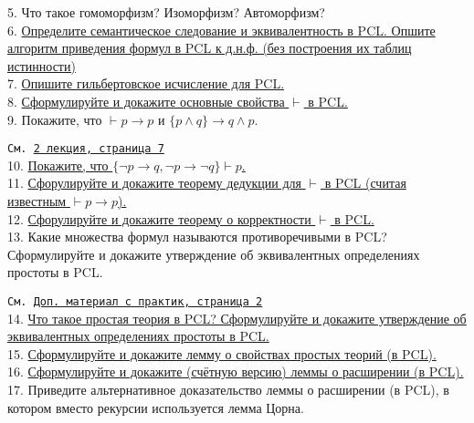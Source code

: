 \documentclass[a4paper,100pt]{article}
\theoremstyle{indented}
\theoremstyle{definition}
\theoremstyle{remark}
\DeclareMathOperator{\ra}{\rightarrow}
\begin{document}
5. %
{Что такое гомоморфизм? Изоморфизм? Автоморфизм?} \\

6. \hyperlink{b6}{Определите семантическое следование и эквивалентность в PCL. Опшите алгоритм приведения формул в PCL к д.н.ф. (без построения их таблиц истинности)} \\ 

7. \hyperlink{b7}{Опишите гильбертовское исчисление для PCL.} \\

8. \hyperlink{b8}{Сформулируйте и докажите основные свойства $\vdash$ в PCL.} \\

9. %
{Покажите, что $\vdash p \ra p$ и $\{p\wedge q\}\ra q \wedge p$.} \

\texttt{См. \href{http://www.mi-ras.ru/~speranski/courses/logic-1-2021-spring/slides_2.pdf}{2 лекция, страница 7}}\\

10. \hyperlink{b10}{Покажите, что $\{\neg p \ra q, \neg p \ra \neg q\} \vdash p$.} \\

11. \hyperlink{b11}{Сфорулируйте и докажите теорему дедукции для $\vdash$ в PCL (считая известным $\vdash p \ra p$).} \\

12. \hyperlink{b12}{Сфорулируйте и докажите теорему о корректности $\vdash$ в PCL.} \\

13. %
{Какие множества формул называются противоречивыми в PCL? Сформулируйте и докажите утверждение об эквивалентных определениях простоты в PCL.} \

\texttt{См. \href{http://www.mi-ras.ru/~speranski/courses/logic-1-2021-spring/slides-more_pcl.pdf}{Доп. материал с практик, страница 2}} \\

14. \hyperlink{b14}{Что такое простая теория в PCL? Сформулируйте и докажите утверждение об эквивалентных определениях простоты в PCL.} \\

15. \hyperlink{b15}{Сформулируйте и докажите лемму о свойствах простых теорий (в PCL).} \\

16. \hyperlink{b16}{Сформулируйте и докажите (счётную версию) леммы о расширении (в PCL).} \\

17. %
{Приведите альтернативное доказательство леммы о расширении (в PCL), в котором вместо рекурсии используется лемма Цорна.} \ 
\end{document}
